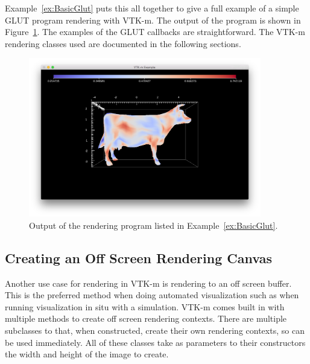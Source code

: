 Example~\ref{ex:BasicGlut} puts this all together to give a full example of
a simple GLUT program rendering with VTK-m. The output of the program is
shown in Figure~\ref{fig:BasicGlut}. The examples of the GLUT callbacks are
straightforward. The VTK-m rendering classes used are documented in the
following sections.


\begin{figure}[htb]
  \centering
  \includegraphics[width=4in]{images/BasicGlut}
  \caption{Output of the rendering program listed in
    Example~\ref{ex:BasicGlut}.}
  \label{fig:BasicGlut}
\end{figure}


\subsection{Creating an Off Screen Rendering Canvas}


Another use case for rendering in VTK-m is rendering to an off screen
buffer. This is the preferred method when doing automated visualization
such as when running visualization in situ with a simulation. VTK-m comes
built in with multiple methods to create off screen rendering contexts.
There are multiple subclasses to  that, when
constructed, create their own rendering contexts, so can be used
immediately. All of these classes take as parameters to their constructors
the width and height of the image to create.

